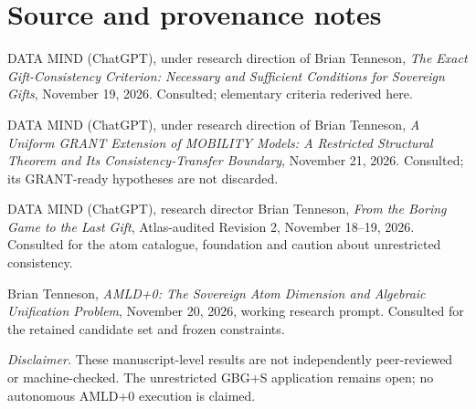 \documentclass[11pt,letterpaper]{article}
\theoremstyle{definition}
\begin{document}
\section*{Source and provenance notes}
\begin{enumerate}[label={[\arabic*]},leftmargin=2.4em]
\item DATA MIND (ChatGPT), under research direction of Brian Tenneson, \emph{The Exact Gift-Consistency Criterion: Necessary and Sufficient Conditions for Sovereign Gifts}, November 19, 2026. Consulted; elementary criteria rederived here.
\item DATA MIND (ChatGPT), under research direction of Brian Tenneson, \emph{A Uniform GRANT Extension of MOBILITY Models: A Restricted Structural Theorem and Its Consistency-Transfer Boundary}, November 21, 2026. Consulted; its GRANT-ready hypotheses are not discarded.
\item DATA MIND (ChatGPT), research director Brian Tenneson, \emph{From the Boring Game to the Last Gift}, Atlas-audited Revision 2, November 18--19, 2026. Consulted for the atom catalogue, foundation and caution about unrestricted consistency.
\item Brian Tenneson, \emph{AMLD+0: The Sovereign Atom Dimension and Algebraic Unification Problem}, November 20, 2026, working research prompt. Consulted for the retained candidate set and frozen constraints.
\end{enumerate}
\vspace{0.5em}
\noindent\textit{Disclaimer.} These manuscript-level results are not independently peer-reviewed or machine-checked. The unrestricted GBG+S application remains open; no autonomous AMLD+0 execution is claimed.
\end{document}
